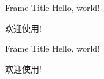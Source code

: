 \documentclass{beamer}
\begin{document}
\begin{frame}{Frame Title}
  	Hello, world!
	
	欢迎使用!
\end{frame}

\begin{frame}{Frame Title}
  	Hello, world!
	
	欢迎使用!
\end{frame}
\end{document}

